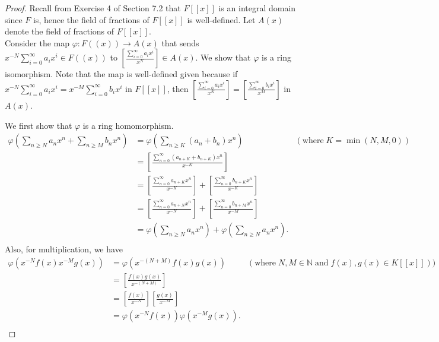 \documentclass{article}
\begin{document}
  \begin{proof}
    Recall from Exercise 4 of Section 7.2 that $F[[x]]$ is an integral
    domain since $F$ is, hence the field of fractions of $F[[x]]$ is
    well-defined. Let $A(x)$ denote the field of fractions of $F[[x]]$. \\

    Consider the map $\varphi:F((x))\rightarrow A(x)$ that
    sends $x^{-N}\sum_{i=0}^\infty a_ix^i\in F((x))$ to
    $\left[\frac{\sum_{i=0}^\infty a_ix^i}{x^N}\right]\in A(x)$. We show
    that $\varphi$ is a ring isomorphism. Note that the map is
    well-defined given because if $x^{-N}\sum_{i=0}^\infty
    a_ix^i =x^{-M}\sum_{i=0}^\infty b_ix^i$ in $F[[x]]$, then
    $\left[\frac{\sum_{i=0}^\infty a_ix^i}{x^N}\right]
    =\left[\frac{\sum_{i=0}^\infty b_ix^i}{x^M}\right]$ in $A(x)$.

    We first show that $\varphi$ is a ring homomorphism.
    \begin{align*}
      \varphi\left(\sum_{n\geq N}a_nx^n+\sum_{n\geq M}b_nx^n\right)
        &=\varphi\left(\sum_{n\geq K}(a_n+b_n)x^n\right) &
        (\text{where}\; K=\min(N,M,0)) \\
        &=\left[\frac{\sum_{n=0}^\infty(a_{n+K}+b_{n+K})x^n}{x^{-K}}\right]
          \\
        &=\left[\frac{\sum_{n=0}^\infty a_{n+K}x^n}{x^{-K}}\right]+
          \left[\frac{\sum_{n=0}^\infty b_{n+K}x^n}{x^{-K}}\right] \\
        &=\left[\frac{\sum_{n=0}^\infty a_{n+N}x^n}{x^{-N}}\right]+
          \left[\frac{\sum_{n=0}^\infty b_{n+M}x^n}{x^{-M}}\right] \\
        &=\varphi\left(\sum_{n\geq N}a_nx^n\right)+
          \varphi\left(\sum_{n\geq N}a_nx^n\right). \\
    \end{align*}
    Also, for multiplication, we have
    \begin{align*}
      \varphi\left(x^{-N}f(x)x^{-M}g(x)\right)
        &=\varphi\left(x^{-(N+M)}f(x)g(x)\right) &
        (\text{where}\; N,M\in\mathbb{N}\; \text{and}\; f(x),g(x)\in
        K[[x]])) \\
        &=\left[\frac{f(x)g(x)}{x^{-(N+M)}}\right] \\
        &=\left[\frac{f(x)}{x^{-N}}\right] \left[\frac{g(x)}{x^{-M}}\right]
          \\
        &=\varphi\left(x^{-N}f(x)\right) \varphi\left(x^{-M}g(x)\right). \\
    \end{align*}


\end{proof}
\end{document}

